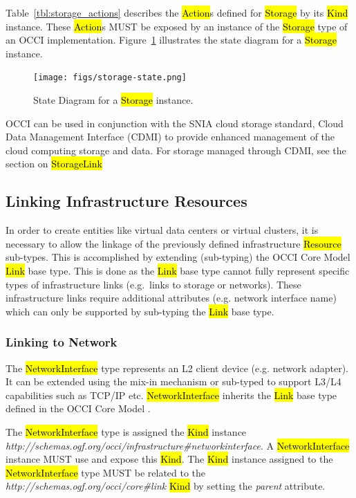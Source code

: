 \documentclass[10pt,a4paper]{article}
\begin{document}
Table~\ref{tbl:storage_actions} describes the \hl{Action}s defined for
\hl{Storage} by its \hl{Kind} instance. These \hl{Action}s MUST be
exposed by an instance of the \hl{Storage} type of an OCCI
implementation.  Figure~\ref{fig:storage_state} illustrates the state
diagram for a \hl{Storage} instance.

\begin{figure}[!h]
	\centering
	\texttt{[image: figs/storage-state.png]}
	\caption{State Diagram for a \hl{Storage} instance.}
	\label{fig:storage_state}
\end{figure}

OCCI can be used in conjunction with the SNIA cloud storage standard,
Cloud Data Management Interface (CDMI) \cite{cdmi} to provide enhanced
management of the cloud computing storage and data. For storage
managed through CDMI, see the section on \hl{StorageLink}

\subsection{Linking Infrastructure Resources}
In order to create entities like virtual data centers or virtual
clusters, it is necessary to allow the linkage of the previously
defined infrastructure \hl{Resource} sub-types. This is accomplished
by extending (sub-typing) the OCCI Core Model \hl{Link} base type.
This is done as the \hl{Link} base type cannot fully represent
specific types of infrastructure links (e.g.~links to storage or
networks).  These infrastructure links require additional attributes
(e.g.  network interface name) which can only be supported by
sub-typing the \hl{Link} base type.

\subsubsection{Linking to Network}
The \hl{NetworkInterface} type represents an L2 client device (e.g.
network adapter). It can be extended using the mix-in mechanism or
sub-typed to support L3/L4 capabilities such as TCP/IP etc.
\hl{NetworkInterface} inherits the \hl{Link} base type defined in the
OCCI Core Model \cite{occi:core}.

The \hl{NetworkInterface} type is assigned the \hl{Kind} instance
\textit{http://schemas.ogf.org/occi/infrastructure\#networkinterface}.
A \hl{NetworkInterface} instance MUST use and expose this \hl{Kind}.
The \hl{Kind} instance assigned to the \hl{NetworkInterface} type MUST
be related to the \textit{http://schemas.ogf.org/occi/core\#link}
\hl{Kind} by setting the \textit{parent} attribute.
\end{document}
